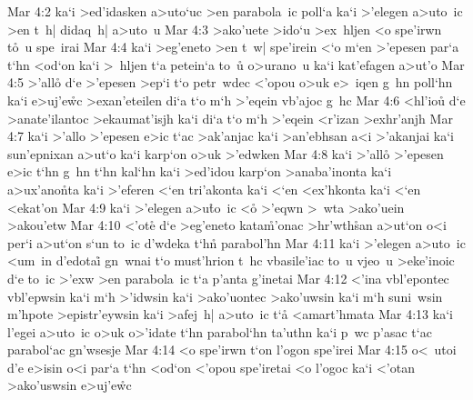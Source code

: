 \vs Mar 4:2
ka`i
>ed'idasken
a>uto`uc
>en
parabola~ic
poll`a
ka`i
>'elegen
a>uto~ic
>en
t~h|
didaq~h|
a>uto~u\bibvsend
\vs Mar 4:3
>ako'uete
>ido`u
>ex~hljen
<o
spe'irwn
t\r{o}~u
spe~irai\bibvsend
\vs Mar 4:4
ka`i
>eg'eneto
>en
t~w|
spe'irein
<`o
m`en
>'epesen
par`a
t`hn
<od`on
ka`i
>~hljen
t`a
petein`a
to~u\r{}
o>urano~u
ka`i
kat'efagen
a>ut'o\bibvsend
\vs Mar 4:5
>'allo\r{}
d`e
>'epesen
>ep`i
t`o
petr~wdec
<'opou
o>uk
e>~iqen
g~hn
poll`hn
ka`i
e>uj'e\r{w}c
>exan'eteilen
di`a
t`o
m`h
>'eqein
vb'ajoc
g~hc\bibvsend
\vs Mar 4:6
<hl'iou\r{}
d`e
>anate'ilantoc
>ekaumat'isjh
ka`i
di`a
t`o
m`h
>'eqein
<r'izan
>exhr'anjh\bibvsend
\vs Mar 4:7
ka`i
>'allo
>'epesen
e>ic
t`ac
>ak'anjac
ka`i
>an'ebhsan
a<i
>'akanjai
ka`i
sun'epnixan
a>ut`o
ka`i
karp`on
o>uk
>'edwken\bibvsend
\vs Mar 4:8
ka`i
>'all\r{o}
>'epesen
e>ic
t`hn
g~hn
t`hn
kal`hn
ka`i
>ed'idou
karp`on
>anaba'inonta
ka`i
a>ux'ano\r{n}ta
ka`i
>'eferen
<`en
tri'akonta
ka`i
<`en
<ex'hkonta
ka`i
<`en
<ekat'on\bibvsend
\vs Mar 4:9
ka`i
>'elegen
a>u\r{t}o~ic
<o\r{}
>'eqwn
>~wta
>ako'uein
>akou'etw\bibvsend
\vs Mar 4:10
<'ote\r{}
d`e
>eg'eneto
kata\r{m}'onac
>hr'wth\r{s}an
a>ut`on
o<i
per`i
a>ut`on
s`un
to~ic
d'wdeka
t`hn\r{}
parabol'hn\bibvsend
\vs Mar 4:11
ka`i
>'elegen
a>uto~ic
<um~in
d'edotai\r{}
gn~wnai
t`o
must'hrion
t~hc
vbasile'iac
to~u
vjeo~u
>eke'inoic
d`e
to~ic
>'exw
>en
parabola~ic
t`a
p'anta
g'inetai\bibvsend
\vs Mar 4:12
<'ina
vbl'epontec
vbl'epwsin
ka`i
m`h
>'idwsin
ka`i
>ako'uontec
>ako'uwsin
ka`i
m`h
suni~wsin
m'hpote
>epistr'eywsin
ka`i
>afej~h|
a>uto~ic
t`a\r{}
<amart'hmata\bibvsend
\vs Mar 4:13
ka`i
l'egei
a>uto~ic
o>uk
o>'idate
t`hn
parabol`hn
ta'uthn
ka`i
p~wc
p'asac
t`ac
parabol`ac
gn'wsesje\bibvsend
\vs Mar 4:14
<o
spe'irwn
t`on
l'ogon
spe'irei\bibvsend
\vs Mar 4:15
o<~utoi
d'e
e>isin
o<i
par`a
t`hn
<od`on
<'opou
spe'iretai
<o
l'ogoc
ka`i
<'otan
>ako'uswsin
e>uj'e\r{w}c
